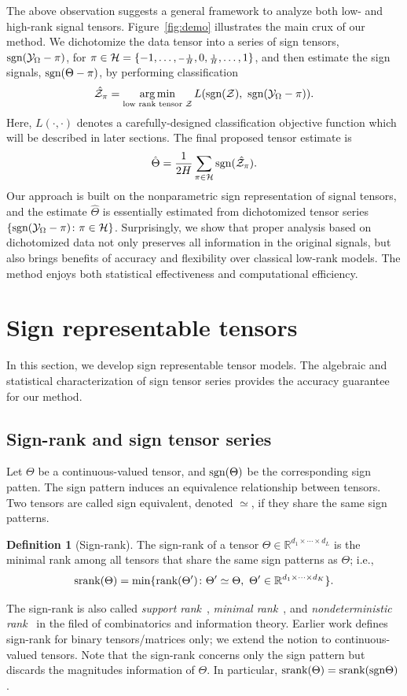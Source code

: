 \documentclass{article}
\theoremstyle{plain}
\theoremstyle{definition}
\newtheorem{defn}{Definition}
\def\sign{\textup{sgn}}
\def\srank{\textup{srank}}
\def\rank{\textup{rank}}
\begin{document}
The above observation suggests a general framework to analyze both low- and high-rank signal tensors. Figure~\ref{fig:demo} illustrates the main crux of our method. We dichotomize the data tensor into a series of sign tensors, $\sign (\tY_\Omega-\pi)$, for $\pi\in \mathcal{H}=\{-1,\ldots, {\scriptstyle -{1\over H}},0,{\scriptstyle {1\over H}},\ldots,1\}$, and then estimate the sign signals, $\sign(\Theta-\pi)$, by performing classification
\[
\hat \tZ_\pi=\argmin_{\text{low rank tensor $\tZ$}} L(\sign(\tZ),\ \sign (\tY_\Omega-\pi)).
\]
Here, $L(\cdot,\cdot)$ denotes a carefully-designed classification objective function which will be described in later sections. The final proposed tensor estimate is 
\[
\hat \Theta = {1\over 2H}\sum_{\pi \in \tH} \sign(\hat \tZ_\pi).
\]
Our approach is built on the nonparametric sign representation of signal tensors, and the estimate $\hat \Theta$ is essentially estimated from dichotomized tensor series $\{\sign(\tY_\Omega-\pi)\colon \pi \in \tH\}$. Surprisingly, we show that proper analysis based on dichotomized data not only preserves all information in the original signals, but also brings benefits of accuracy and flexibility over classical low-rank models. The method enjoys both statistical effectiveness and computational efficiency. 


\section{Sign representable tensors}\label{sec:representation}
In this section, we develop sign representable tensor models. The algebraic and statistical characterization of sign tensor series provides the accuracy guarantee for our method. 

\subsection{Sign-rank and sign tensor series}\label{sec:sign-rank}
Let $\Theta$ be a continuous-valued tensor, and $\sign (\Theta)$ be the corresponding sign patten. The sign pattern induces an equivalence relationship between tensors. Two tensors are called sign equivalent, denoted $\simeq$, if they share the same sign patterns. 

\begin{defn}[Sign-rank]
The sign-rank of a tensor $\Theta\in\mathbb{R}^{d_1\times \cdots \times d_L}$ is the minimal rank among all tensors that share the same sign patterns as $\Theta$; i.e.,
\[
\srank(\Theta) = \min \{\rank(\Theta')\colon  \Theta'\simeq \Theta,\ \Theta'\in\mathbb{R}^{d_1\times \cdots \times d_K}\}.
\]
\end{defn}
The sign-rank is also called \emph{support rank}~\cite{cohn2013fast}, \emph{minimal rank}~\cite{alon2016sign}, and \emph{nondeterministic rank}~\cite{de2003nondeterministic} in the filed of combinatorics and information theory. Earlier work defines sign-rank for binary tensors/matrices only; we extend the notion to continuous-valued tensors. Note that the sign-rank concerns only the sign pattern but discards the magnitudes information of $\Theta$. In particular, $\srank(\Theta)=\srank(\sign \Theta)$. 
\end{document}
